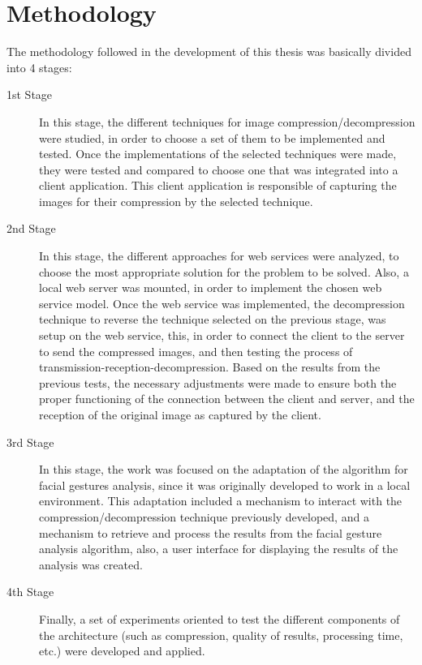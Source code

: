 \documentclass[12pt,letterpaper,titlepage]{book}
\begin{document}
\chapter{Methodology}\label{capIII}
The methodology followed in the development of this thesis was basically divided into 4 stages:
\begin{description}
\item[1st Stage] In this stage, the different techniques for image compression/decompression were studied, in order to choose a set of them to be implemented and tested. Once the implementations of the selected techniques were made, they were tested and compared to choose one that was integrated into a client application. This client application is responsible of capturing the images for their compression by the selected technique.

\item[2nd Stage] In this stage, the different approaches for web services were analyzed, to choose the most appropriate solution for the problem to be solved. Also, a local web server was mounted, in order to implement the chosen web service model. Once the web service was implemented, the decompression technique to reverse the technique selected on the previous stage, was setup on the web service, this, in order to connect the client to the server to send the compressed images, and then testing the process of transmission-reception-decompression. Based on the results from the previous tests, the necessary adjustments were made to ensure both the proper functioning of the connection between the client and server, and the reception of the original image as captured by the client.

\item[3rd Stage] In this stage, the work was focused on the adaptation of the algorithm for facial gestures analysis, since it was originally developed to work in a local environment. This adaptation included a mechanism to interact with the compression/decompression technique previously developed, and a mechanism to retrieve and process the results from the facial gesture analysis algorithm, also, a user interface for displaying the results of the analysis was created.

\item[4th Stage] Finally, a set of experiments oriented to test the different components of the architecture (such as compression, quality of results, processing time, etc.) were developed and applied.
\end{description}
\end{document}
